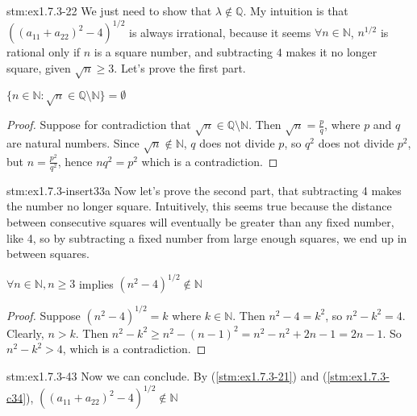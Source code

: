 \begin{explanation}{stm:ex1.7.3-22}
We just need to show that $\lambda \notin \mathbb{Q}$. My intuition is that $((a_{11} + a_{22})^2 - 4)^{1/2}$ is always irrational, because it seems $\forall n \in \mathbb{N}$, $n^{1/2}$ is rational only if $n$ is a square number, and subtracting $4$ makes it no longer square, given $\sqrt{n} \ge 3$. Let's prove the first part.
\end{explanation}

\begin{conj}\label{stm:ex1.7.3-c23}
$\{n \in \mathbb{N} : \sqrt{n} \in \mathbb{Q} \setminus \mathbb{N} \} = \emptyset$
\end{conj}

\begin{proof}
Suppose for contradiction that $\sqrt{n} \in \mathbb{Q} \setminus \mathbb{N}$. Then $\sqrt{n} = \frac{p}{q}$, where $p$ and $q$ are natural numbers. Since $\sqrt{n} \notin \mathbb{N}$, $q$ does not divide $p$, so $q^2$ does not divide $p^2$, but $n = \frac{p^2}{q^2}$, hence $n q^2 = p^2$ which is a contradiction.
\end{proof}

\begin{explanation}{stm:ex1.7.3-insert33a}
Now let's prove the second part, that subtracting 4 makes the number no longer square. Intuitively, this seems true because the distance between consecutive squares will eventually be greater than any fixed number, like 4, so by subtracting a fixed number from large enough squares, we end up in between squares.
\end{explanation}

\begin{conj}\label{stm:ex1.7.3-c34}
$\forall n \in \mathbb{N}, n \ge 3$ implies $(n^2 - 4)^{1/2} \notin \mathbb{N}$
\end{conj}

\begin{proof}
Suppose $(n^2 - 4)^{1/2} = k$ where $k \in \mathbb{N}$. Then $n^2 - 4 = k^2$, so $n^2 - k^2 = 4$. Clearly, $n > k$. Then $n^2 - k^2 \ge n^2 - (n - 1)^2 = n^2 - n^2 + 2n - 1 = 2n - 1$. So $n^2 - k^2 > 4$, which is a contradiction.
\end{proof}

\begin{statement}{stm:ex1.7.3-43}
Now we can conclude. By (\ref{stm:ex1.7.3-21}) and (\ref{stm:ex1.7.3-c34}), $((a_{11} + a_{22})^2 - 4)^{1/2} \notin \mathbb{N}$
\end{statement}

